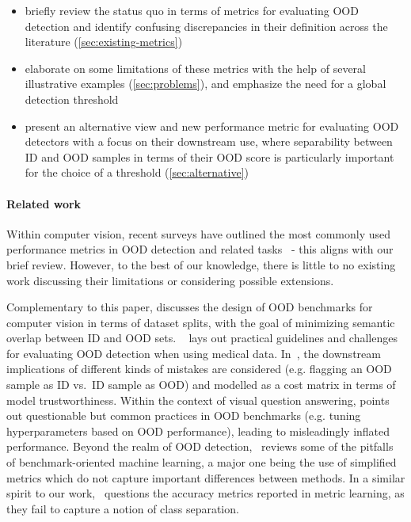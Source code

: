 \documentclass[10pt,twocolumn,letterpaper]{article}
\begin{document}
\begin{itemize}[itemsep=2pt,topsep=2pt,parsep=1pt]
    \item briefly review the status quo in terms of metrics for evaluating OOD detection and identify confusing discrepancies in their definition across the literature (\cref{sec:existing-metrics})
    \item elaborate on some limitations of these metrics with the help of several illustrative examples (\cref{sec:problems}), and emphasize the need for a global detection threshold
    \item present an alternative view and new performance metric for evaluating OOD detectors with a focus on their downstream use, where separability between ID and OOD samples in terms of their OOD score is particularly important for the choice of a threshold (\cref{sec:alternative})
\end{itemize}


\paragraph{Related work} Within computer vision, recent surveys have outlined the most commonly used performance metrics in OOD detection and related tasks~\cite{generalized-ood-survey-2021,unified-ood-survey-2022} - this aligns with our brief review. However, to the best of our knowledge, there is little to no existing work discussing their limitations or considering possible extensions.

Complementary to this paper, \cite{ood-benchmarks-splitting-2021} discusses the design of OOD benchmarks for computer vision in terms of dataset splits, with the goal of minimizing semantic overlap between ID and OOD sets. ~\cite{ood-practical-eval-guidelines-2023} lays out practical guidelines and challenges for evaluating OOD detection when using medical data. In~\cite{derma-ood-2022}, the downstream implications of different kinds of mistakes are considered (e.g. flagging an OOD sample as ID vs.~ID sample as OOD) and modelled as a cost matrix in terms of model trustworthiness. Within the context of visual question answering, \cite{vqa-ood-2020} points out questionable but common practices in OOD benchmarks (e.g. tuning hyperparameters based on OOD performance), leading to misleadingly inflated performance.
\newpage
Beyond the realm of OOD detection,~\cite{failure-metareview-2021} reviews some of the pitfalls of benchmark-oriented machine learning, a major one being the use of simplified metrics which do not capture important differences between methods. In a similar spirit to our work,~\cite{metric-learning-reality-check-2020} questions the accuracy metrics reported in metric learning, as they fail to capture a notion of class separation.
\end{document}
